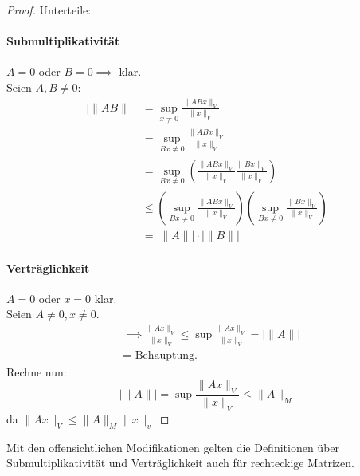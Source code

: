 \begin{proof}
Unterteile:
\paragraph{Submultiplikativität} $A=0$ oder $B=0 \implies$ klar. \\
Seien $A,B \neq 0$:
\begin{align*}
	|\|AB\|| 
	&= \sup_{x\neq 0} \frac{\|ABx\|_V}{\|x\|_V} \\
	&= \sup_{Bx\neq 0} \frac{\|ABx\|_V}{\|x\|_V} \\
	&= \sup_{Bx \neq 0} \left( \frac{\|ABx\|_V}{\|x\|_V} \frac{\|Bx\|_V}{\|x\|_V} \right) \\
	&\le \left( \sup_{Bx \neq 0} \frac{\|ABx\|_V}{\|x\|_V} \right) \left( \sup_{Bx\neq 0} \frac{\|Bx\|_V}{\|x\|_V} \right) \\
	&= |\|A\|| \cdot |\|B\||
\end{align*}
\paragraph{Verträglichkeit} $A= 0$ oder $x=0$  klar. \\
Seien $A \neq 0, x\neq 0$. 
\begin{align*}
&\implies \frac{\|Ax\|_V}{\|x\|_V} \le \sup \frac{\|Ax\|_V}{\|x\|_V} = |\|A\|| \\
&= \text{ Behauptung.}
\end{align*}
Rechne nun: 
\[
|\|A\|| = \sup \frac{\|Ax\|_V}{\|x\|_V}\le  \|A\|_M
\]
da $\|Ax\|_V \le \|A\|_M \|x\|_v$ 
\end{proof}
\begin{remark}
Mit den offensichtlichen Modifikationen gelten die Definitionen über Submultiplikativität und Verträglichkeit auch für rechteckige Matrizen.
\end{remark}
